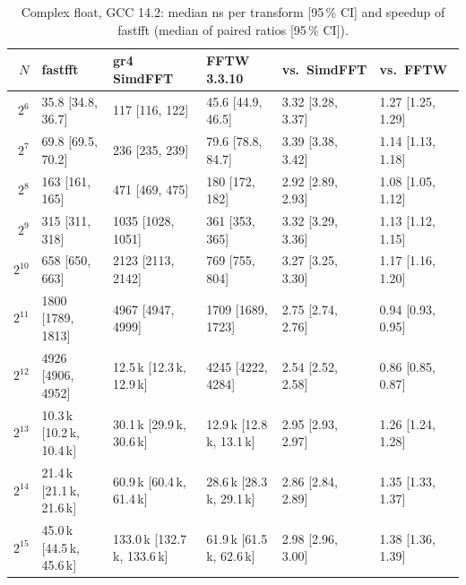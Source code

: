 \begin{table}[h]\centering
\caption{Complex float, GCC 14.2: median ns per transform [95\,\% CI] and speedup of fastfft (median of paired ratios [95\,\% CI]).}\label{tab:float}
\begin{tabular}{rlllll}\toprule
$N$ & fastfft & gr4 SimdFFT & FFTW 3.3.10 & vs.\ SimdFFT & vs.\ FFTW\\\midrule
$2^{6}$ & 35.8 {\scriptsize[34.8, 36.7]} & 117 {\scriptsize[116, 122]} & 45.6 {\scriptsize[44.9, 46.5]} & 3.32 {\scriptsize[3.28, 3.37]} & 1.27 {\scriptsize[1.25, 1.29]}\\
$2^{7}$ & 69.8 {\scriptsize[69.5, 70.2]} & 236 {\scriptsize[235, 239]} & 79.6 {\scriptsize[78.8, 84.7]} & 3.39 {\scriptsize[3.38, 3.42]} & 1.14 {\scriptsize[1.13, 1.18]}\\
$2^{8}$ & 163 {\scriptsize[161, 165]} & 471 {\scriptsize[469, 475]} & 180 {\scriptsize[172, 182]} & 2.92 {\scriptsize[2.89, 2.93]} & 1.08 {\scriptsize[1.05, 1.12]}\\
$2^{9}$ & 315 {\scriptsize[311, 318]} & 1035 {\scriptsize[1028, 1051]} & 361 {\scriptsize[353, 365]} & 3.32 {\scriptsize[3.29, 3.36]} & 1.13 {\scriptsize[1.12, 1.15]}\\
$2^{10}$ & 658 {\scriptsize[650, 663]} & 2123 {\scriptsize[2113, 2142]} & 769 {\scriptsize[755, 804]} & 3.27 {\scriptsize[3.25, 3.30]} & 1.17 {\scriptsize[1.16, 1.20]}\\
$2^{11}$ & 1800 {\scriptsize[1789, 1813]} & 4967 {\scriptsize[4947, 4999]} & 1709 {\scriptsize[1689, 1723]} & 2.75 {\scriptsize[2.74, 2.76]} & 0.94 {\scriptsize[0.93, 0.95]}\\
$2^{12}$ & 4926 {\scriptsize[4906, 4952]} & 12.5\,k {\scriptsize[12.3\,k, 12.9\,k]} & 4245 {\scriptsize[4222, 4284]} & 2.54 {\scriptsize[2.52, 2.58]} & 0.86 {\scriptsize[0.85, 0.87]}\\
$2^{13}$ & 10.3\,k {\scriptsize[10.2\,k, 10.4\,k]} & 30.1\,k {\scriptsize[29.9\,k, 30.6\,k]} & 12.9\,k {\scriptsize[12.8\,k, 13.1\,k]} & 2.95 {\scriptsize[2.93, 2.97]} & 1.26 {\scriptsize[1.24, 1.28]}\\
$2^{14}$ & 21.4\,k {\scriptsize[21.1\,k, 21.6\,k]} & 60.9\,k {\scriptsize[60.4\,k, 61.4\,k]} & 28.6\,k {\scriptsize[28.3\,k, 29.1\,k]} & 2.86 {\scriptsize[2.84, 2.89]} & 1.35 {\scriptsize[1.33, 1.37]}\\
$2^{15}$ & 45.0\,k {\scriptsize[44.5\,k, 45.6\,k]} & 133.0\,k {\scriptsize[132.7\,k, 133.6\,k]} & 61.9\,k {\scriptsize[61.5\,k, 62.6\,k]} & 2.98 {\scriptsize[2.96, 3.00]} & 1.38 {\scriptsize[1.36, 1.39]}\\

\end{tabular}
\end{table}

